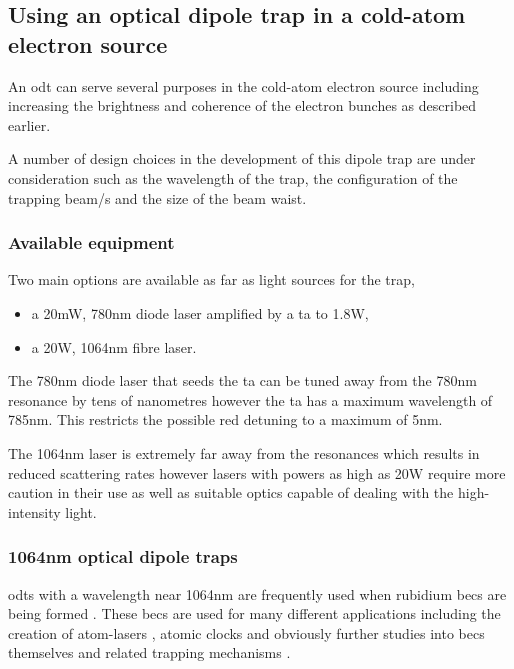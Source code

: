 \subsection{Using an optical dipole trap in a cold-atom electron source}
An \gls{odt} can serve several purposes in the cold-atom electron source including increasing the brightness and coherence of the electron bunches as described earlier.

A number of design choices in the development of this dipole trap are under consideration such as the wavelength of the trap, the configuration of the trapping beam/s and the size of the beam waist.

\subsubsection{Available equipment}
Two main options are available as far as light sources for the trap,
\begin{itemize}
    \item a 20mW, 780nm diode laser amplified by a \gls{ta} to 1.8W,
    \item a 20W, 1064nm fibre laser.
\end{itemize}

The 780nm diode laser that seeds the \gls{ta} can be tuned away from the 780nm resonance by tens of nanometres however the \gls{ta} has a maximum wavelength of 785nm. This restricts the possible red detuning to a maximum of 5nm.

The 1064nm laser is extremely far away from the resonances which results in reduced scattering rates however lasers with powers as high as 20W require more caution in their use as well as suitable optics capable of dealing with the high-intensity light.

\subsubsection{1064nm optical dipole traps}
\Glspl{odt} with a wavelength near 1064nm are frequently used when rubidium \glspl{bec} are being formed \cite{chikkatur_continuous_2002, couvert_quasi-monomode_2008, kleine_buning_slow_2010, lin_rapid_2009, arnold_all-optical_2011, fu_bose-einstein_2011}. These \glspl{bec} are used for many different applications including the creation of atom-lasers \cite{kleine_buning_slow_2010, chikkatur_continuous_2002, couvert_quasi-monomode_2008}, atomic clocks\cite{kleine_buning_extended_2011} and obviously further studies into \glspl{bec} themselves and related trapping mechanisms \cite{arnold_all-optical_2011, fu_bose-einstein_2011, lin_rapid_2009}.


